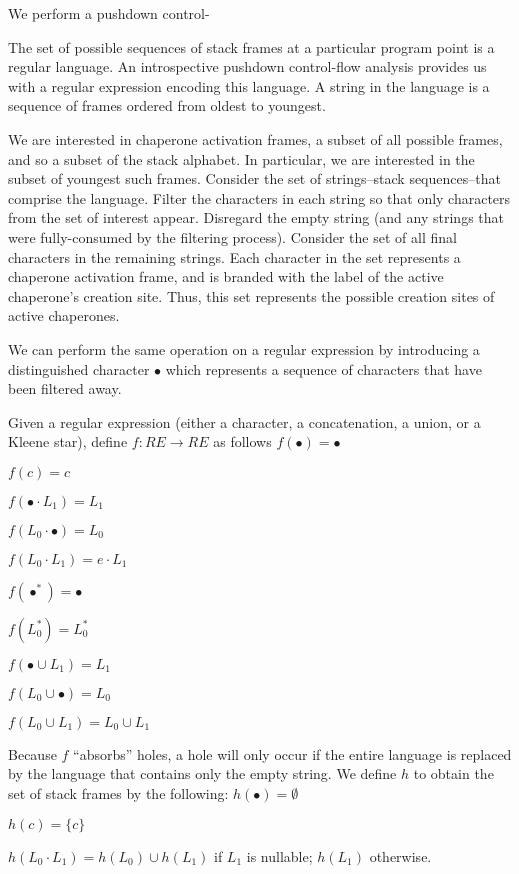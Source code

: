 \documentclass{sigplanconf}
\begin{document}
We perform a pushdown control-

The set of possible sequences of stack frames at a particular program point is a regular language.
An introspective pushdown control-flow analysis provides us with a regular expression encoding this language.
A string in the language is a sequence of frames ordered from oldest to youngest.

We are interested in chaperone activation frames, a subset of all possible frames, and so a subset of the stack alphabet.
In particular, we are interested in the subset of youngest such frames.
Consider the set of strings--stack sequences--that comprise the language.
Filter the characters in each string so that only characters from the set of interest appear.
Disregard the empty string (and any strings that were fully-consumed by the filtering process).
Consider the set of all final characters in the remaining strings.
Each character in the set represents a chaperone activation frame, and is branded with the label of the active chaperone's creation site.
Thus, this set represents the possible creation sites of active chaperones.

We can perform the same operation on a regular expression by introducing a distinguished character $\bullet$ which represents a sequence of characters that have been filtered away.

Given a regular expression (either a character, a concatenation, a union, or a Kleene star), define $f:RE \longrightarrow RE$ as follows
$f(\bullet)=\bullet$

$f(c)=c$

$f(\bullet\cdot L_1)=L_1$

$f(L_0\cdot\bullet)=L_0$

$f(L_0\cdot L_1)=e\cdot L_1$

$f(\bullet^*)=\bullet$

$f(L_0^*)=L_0^*$

$f(\bullet\cup L_1)=L_1$

$f(L_0\cup\bullet)=L_0$

$f(L_0\cup L_1)=L_0\cup L_1$

Because $f$ ``absorbs'' holes, a hole will only occur if the entire language is replaced by the language that contains only the empty string.
We define $h$ to obtain the set of stack frames by the following:
$h(\bullet)=\emptyset$

$h(c)=\{c\}$

$h(L_0\cdot L_1)=h(L_0)\cup h(L_1)$ if $L_1$ is nullable; $h(L_1)$ otherwise.
\end{document}
